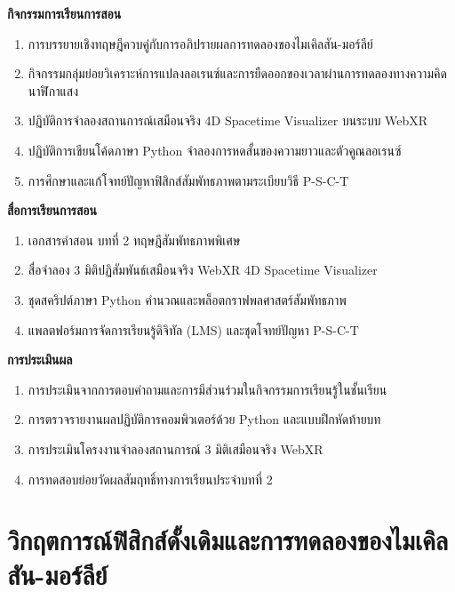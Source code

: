 \begin{lessonplanbox}
\vspace{0.4em}
\noindent\textbf{กิจกรรมการเรียนการสอน}
\begin{enumerate}
    \item การบรรยายเชิงทฤษฎีควบคู่กับการอภิปรายผลการทดลองของไมเคิลสัน-มอร์ลีย์
    \item กิจกรรมกลุ่มย่อยวิเคราะห์การแปลงลอเรนซ์และการยืดออกของเวลาผ่านการทดลองทางความคิดนาฬิกาแสง
    \item ปฏิบัติการจำลองสถานการณ์เสมือนจริง 4D Spacetime Visualizer บนระบบ WebXR
    \item ปฏิบัติการเขียนโค้ดภาษา Python จำลองการหดสั้นของความยาวและตัวคูณลอเรนซ์
    \item การศึกษาและแก้โจทย์ปัญหาฟิสิกส์สัมพัทธภาพตามระเบียบวิธี P-S-C-T
\end{enumerate}

\vspace{0.4em}
\noindent\textbf{สื่อการเรียนการสอน}
\begin{enumerate}
    \item เอกสารคำสอน บทที่ 2 ทฤษฎีสัมพัทธภาพพิเศษ
    \item สื่อจำลอง 3 มิติปฏิสัมพันธ์เสมือนจริง WebXR 4D Spacetime Visualizer
    \item ชุดสคริปต์ภาษา Python คำนวณและพล็อตกราฟพลศาสตร์สัมพัทธภาพ
    \item แพลตฟอร์มการจัดการเรียนรู้ดิจิทัล (LMS) และชุดโจทย์ปัญหา P-S-C-T
\end{enumerate}

\vspace{0.4em}
\noindent\textbf{การประเมินผล}
\begin{enumerate}
    \item การประเมินจากการตอบคำถามและการมีส่วนร่วมในกิจกรรมการเรียนรู้ในชั้นเรียน
    \item การตรวจรายงานผลปฏิบัติการคอมพิวเตอร์ด้วย Python และแบบฝึกหัดท้ายบท
    \item การประเมินโครงงานจำลองสถานการณ์ 3 มิติเสมือนจริง WebXR
    \item การทดสอบย่อยวัดผลสัมฤทธิ์ทางการเรียนประจำบทที่ 2
\end{enumerate}
\end{lessonplanbox}

\newpage

\section{วิกฤตการณ์ฟิสิกส์ดั้งเดิมและการทดลองของไมเคิลสัน-มอร์ลีย์}


